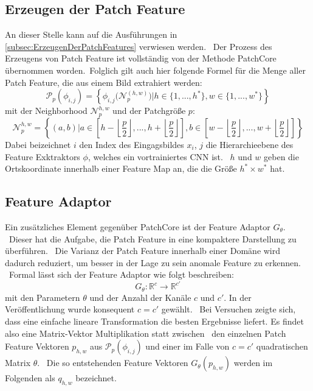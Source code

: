 \subsection{Erzeugen der Patch Feature}\label{subsec:SimpleNet-FeatureExtraktor}
An dieser Stelle kann auf die Ausführungen in \ref{subsec:ErzeugenDerPatchFeatures} verwiesen werden. \ 
Der Prozess des Erzeugens von Patch Feature ist vollständig von der Methode PatchCore übernommen worden.\
Folglich gilt auch hier folgende Formel für die Menge aller Patch Feature, die aus einem Bild extrahiert werden: \\
$$
\mathcal{P}_{p}\left(\phi_{i,j}\right) = \left\{\phi_{i,j}\Big(\mathcal{N}_{p}^{(h,w)}\Big)| h\in\{1,...,h^{*}\}, w\in\{1,...,w^{*}\}\right\}
$$
mit der \glqq Neighborhood\grqq{} $\mathcal{N}_{p}^{h,w}$ und der Patchgröße $p$: \\
$$
\mathcal{N}_{p}^{h,w} = \left\{(a,b)| a \in \left[h-\left\lfloor \frac{p}{2}\right\rfloor,...,h+\left\lfloor \frac{p}{2} \right\rfloor\right], b \in \left[w-\left\lfloor \frac{p}{2}\right\rfloor,...,w+\left\lfloor \frac{p}{2}\right\rfloor\right]\right\}
$$
Dabei beizeichnet $i$ den Index des Eingagsbildes $x_{i}$, $j$ die Hierarchieebene des Feature Exktraktors $\phi$, welches ein vortrainiertes CNN ist. \
$h$ und $w$ geben die Ortskoordinate innerhalb einer Feature Map an, die die Größe $h^{*} \times w^{*}$ hat. \\
\subsection{Feature Adaptor}\label{subsec:SimpleNet-FeatureAdaptor}
Ein zusätzliches Element gegenüber PatchCore ist der Feature Adaptor $G_{\theta}$. \
Dieser hat die Aufgabe, die Patch Feature in eine kompaktere Darstellung zu überführen. \
Die Varianz der Patch Feature innerhalb einer Domäne wird dadurch reduziert, um besser in der Lage zu sein anomale Feature zu erkennen. \
Formal lässt sich der Feature Adaptor wie folgt beschreiben: \\
$$
G_{\theta}:\mathbb{R}^{c} \rightarrow \mathbb{R}^{c'}
$$
mit den Parametern $\theta$ und der Anzahl der Kanäle $c$ und $c'$. In der Veröffentlichung wurde konsequent $c = c'$ gewählt. \
Bei Versuchen zeigte sich, dass eine einfache lineare Transformation die besten Ergebnisse liefert. Es findet also eine Matrix-Vektor Multiplikation statt zwischen \ 
den einzelnen Patch Feature Vektoren $p_{h,w}$ aus $\mathcal{P}_{p}\left(\phi_{i,j}\right)$ und einer im Falle von $c = c'$ quadratischen Matrix $\theta$. \
Die so entstehenden Feature Vektoren $G_{\theta}(p_{h,w})$ werden im Folgenden als $q_{h,w}$ bezeichnet. \\
